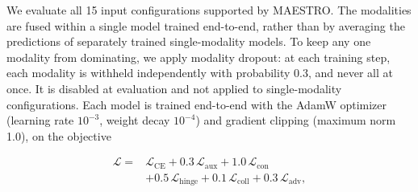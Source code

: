 \documentclass[journal]{IEEEtran}
\begin{document}
We evaluate all 15 input configurations supported by MAESTRO. The modalities are fused within a single model trained end-to-end, rather than by averaging the predictions of separately trained single-modality models. To keep any one modality from dominating, we apply modality dropout: at each training step, each modality is withheld independently with probability 0.3, and never all at once. It is disabled at evaluation and not applied to single-modality configurations. Each model is trained end-to-end with the AdamW optimizer (learning rate $10^{-3}$, weight decay $10^{-4}$) and gradient clipping (maximum norm 1.0), on the objective

\begin{equation}
\begin{split}
\mathcal{L} = {}& \mathcal{L}_{\mathrm{CE}} + 0.3\,\mathcal{L}_{\mathrm{aux}} + 1.0\,\mathcal{L}_{\mathrm{con}} \\
& + 0.5\,\mathcal{L}_{\mathrm{hinge}} + 0.1\,\mathcal{L}_{\mathrm{coll}} + 0.3\,\mathcal{L}_{\mathrm{adv}},
\end{split}
\label{eq:loss}
\end{equation}
\end{document}
